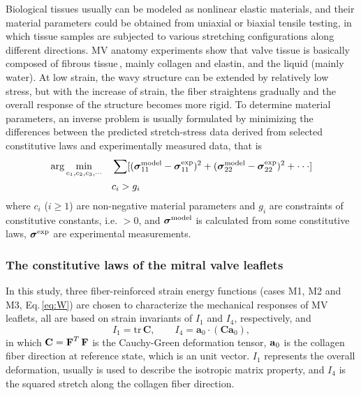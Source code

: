 \documentclass[fleqn,10pt]{wlscirep}
\def\bm#1{\mbox{\boldmath{$#1$}}}
\newcommand*{\V}[1]{\bm{\mathbf #1}}
\begin{document}
Biological tissues usually can be modeled as nonlinear elastic materials, and their material parameters could be obtained from uniaxial or biaxial tensile testing, in which tissue samples are subjected to various stretching configurations along different directions. MV anatomy experiments show that valve tissue is basically composed of fibrous tissue\,\cite{Schoen1999Tissue,Zuo2016Characterization}, mainly collagen and elastin, and the liquid (mainly water). At low strain, the wavy structure can be extended by relatively low stress, but with the increase of strain, the fiber straightens gradually and the overall response of the structure becomes more rigid. To determine material parameters, an inverse problem is usually formulated by minimizing the differences between the predicted stretch-stress data derived from selected constitutive laws and experimentally measured data, that is
\begin{equation}
\begin{split}
\arg \min\limits_{c_{1},c_{2},c_{3},\cdot\cdot\cdot}\quad &\sum [(\bm\sigma_{11}^{\mathrm{model}}-\bm\sigma_{11}^{\mathrm{exp}})^{2}+(\bm\sigma_{22}^{\mathrm{model}}-\bm\sigma_{22}^{\mathrm{exp}})^{2}+\cdot\cdot\cdot]\\
&c_{i}>g_i
\label{YH}
\end{split}
\end{equation}
where $c_{i}$ ($i\geq 1$) are non-negative material parameters and $g_i$ are  constraints of constitutive constants, i.e. $>0$, and $\bm\sigma^{\mathrm{model}}$ is calculated from some constitutive laws, $\bm\sigma^{\mathrm{exp}}$ are experimental measurements.

\subsubsection*{The constitutive laws of the mitral valve leaflets}
In this study, three fiber-reinforced strain energy functions (cases M1, M2 and M3, Eq.\,\ref{eq:W}) are chosen to characterize the mechanical responses of MV leaflets, all are based on strain invariants of $ I_{1} $ and $ I_{4}$,  respectively, and
$$I_{1}=\text{tr} \, \mathbf{C}, \quad \quad I_{4}=\mathbf{a}_{0}\cdot (\mathbf{C}\mathbf{a}_{0}),$$
in which $\V{C} = \V{F}^T\,\V{F}$ is the Cauchy-Green deformation tensor, $\V{a}_0$ is the collagen fiber direction at reference state, which is an unit vector. $I_1$ represents the overall deformation, usually is used to describe the isotropic matrix property, and $I_4$ is the squared stretch along the collagen fiber direction.
\end{document}
